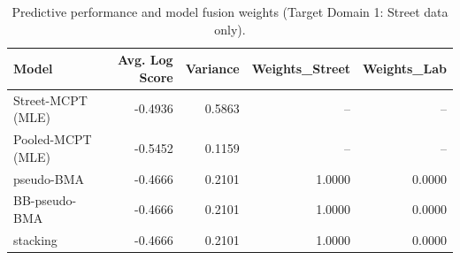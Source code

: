 \begin{table}[htbp]
\centering
\caption{Predictive performance and model fusion weights (Target Domain 1: Street data only).}
\label{tab:domain1_performance}
\begin{tabular}{lrrrr}
\toprule
Model & Avg. Log Score & Variance & Weights\_Street & Weights\_Lab \\
\midrule
Street-MCPT (MLE) & -0.4936 & 0.5863 & -- & -- \\
Pooled-MCPT (MLE) & -0.5452 & 0.1159 & -- & -- \\
pseudo-BMA & -0.4666 & 0.2101 & 1.0000 & 0.0000 \\
BB-pseudo-BMA & -0.4666 & 0.2101 & 1.0000 & 0.0000 \\
stacking & -0.4666 & 0.2101 & 1.0000 & 0.0000 \\
\bottomrule
\end{tabular}
\end{table}
